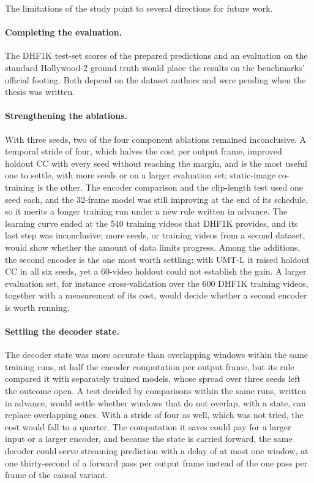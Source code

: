 The limitations of the study point to several directions for future work.

\paragraph{Completing the evaluation.} The DHF1K test-set scores of the
prepared predictions and an evaluation on the standard Hollywood-2 ground truth
would place the results on the benchmarks' official footing. Both depend on the
dataset authors and were pending when the thesis was written.

\paragraph{Strengthening the ablations.} With three seeds, two of the four
component ablations remained inconclusive. A temporal stride of four, which
halves the cost per output frame, improved holdout \acrshort{CC} with every seed without
reaching the margin, and is the most useful one to settle, with more seeds or on
a larger evaluation set; static-image co-training is the other. The encoder
comparison and the clip-length test used one seed each, and the 32-frame model
was still improving at the end of its schedule, so it merits a longer training
run under a new rule written in advance. The learning curve ended at the 540
training videos that DHF1K provides, and its last step was inconclusive; more
seeds, or training videos from a second dataset, would show whether the amount
of data limits progress. Among the additions, the second encoder is the one
most worth settling: with \acrshort{UMT}-L it raised holdout \acrshort{CC} in all six
seeds, yet a 60-video holdout could not establish the gain. A larger
evaluation set, for instance cross-validation over the 600 DHF1K training
videos, together with a measurement of its cost, would decide whether a second
encoder is worth running.

\paragraph{Settling the decoder state.} The decoder state was more accurate
than overlapping windows within the same training runs, at half the encoder
computation per output frame, but its rule compared it with separately trained
models, whose spread over three seeds left the outcome open. A test decided by
comparisons within the same runs, written in advance, would settle whether
windows that do not overlap, with a state, can replace overlapping ones.
With a stride of four as well, which was not tried, the cost would fall to a
quarter. The computation it saves could pay for a larger input or a larger
encoder, and
because the state is carried forward, the same decoder could serve streaming
prediction with a delay of at most one window, at one thirty-second of a
forward pass per output frame instead of the one pass per frame of the causal
variant.

